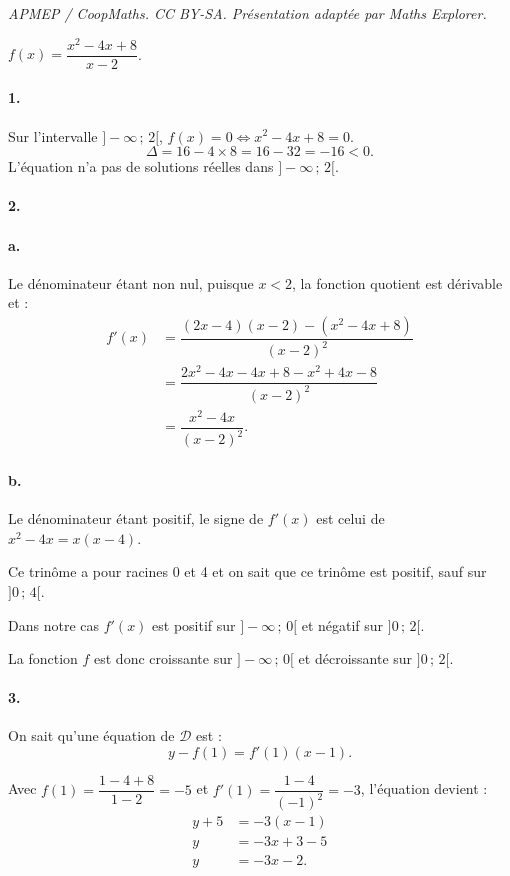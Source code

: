 \documentclass[10pt]{article}
\begin{document}
\noindent\textit{APMEP / CoopMaths. CC BY-SA. Présentation adaptée par Maths Explorer.}\par\medskip
\( f(x) = \dfrac{x^2 - 4x + 8}{x - 2} \).

\paragraph{1.} Sur l'intervalle \( ]-\infty \,;\, 2[ \), \( f(x) = 0 \iff x^2 - 4x + 8 = 0 \).
\[
\Delta = 16 - 4 \times 8 = 16 - 32 = -16 < 0.
\]
L'équation n'a pas de solutions réelles dans \( ]-\infty \,;\, 2[ \).

\paragraph{2.}

\paragraph{a.} Le dénominateur étant non nul, puisque \( x < 2 \), la fonction quotient est dérivable et :
\begin{align*}
f'(x) &= \dfrac{(2x - 4)(x - 2) - (x^2 - 4x + 8)}{(x - 2)^2} \\
&= \dfrac{2x^2 - 4x - 4x + 8 - x^2 + 4x - 8}{(x - 2)^2} \\
&= \dfrac{x^2 - 4x}{(x - 2)^2}.
\end{align*}

\paragraph{b.} Le dénominateur étant positif, le signe de \( f'(x) \) est celui de \( x^2 - 4x = x(x - 4) \).

Ce trinôme a pour racines 0 et 4 et on sait que ce trinôme est positif, sauf sur \( ]0 \,;\, 4[ \).

Dans notre cas \( f'(x) \) est positif sur \( ]-\infty \,;\, 0[ \) et négatif sur \( ]0 \,;\, 2[ \).

La fonction \( f \) est donc croissante sur \( ]-\infty \,;\, 0[ \) et décroissante sur \( ]0 \,;\, 2[ \).

\paragraph{3.} On sait qu'une équation de \( \mathcal{D} \) est :
\[
y - f(1) = f'(1)(x - 1).
\]

Avec \( f(1) = \dfrac{1 - 4 + 8}{1 - 2} = - 5 \) et \( f'(1) = \dfrac{1 - 4}{(-1)^2} = -3 \), l'équation devient :
\begin{align*}
y + 5 &= -3(x - 1) \\
y &= -3x + 3 - 5 \\
y &= -3x - 2.
\end{align*}
\end{document}
